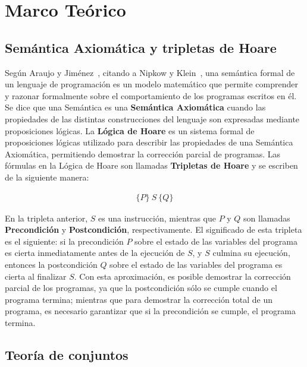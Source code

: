 \chapter{Marco Teórico}
\label{capitulo1}

\section{Semántica Axiomática y tripletas de Hoare}

Según Araujo y Jiménez~\cite{ayj}, citando a Nipkow y Klein~\cite{concrete}, una
semántica formal de un lenguaje de programación es un modelo matemático que
permite comprender y razonar formalmente sobre el comportamiento de los
programas escritos en él. Se dice que una Semántica es una \textbf{Semántica
Axiomática} cuando las propiedades de las  distintas construcciones del lenguaje
son expresadas mediante proposiciones lógicas. La \textbf{Lógica de Hoare} es un
sistema formal de proposiciones lógicas utilizado para describir  las
propiedades de una Semántica Axiomática, permitiendo demostrar la corrección
parcial de programas. Las fórmulas en la Lógica de Hoare son llamadas
\textbf{Tripletas de Hoare} y se escriben de la siguiente manera:

\begin{equation*}
\begin{gathered}
\{P\}\ S\ \{Q\}
\end{gathered}
\end{equation*}


En la tripleta anterior, $S$ es una instrucción, mientras que $P$ y $Q$ son
llamadas \textbf{Precondición} y \textbf{Postcondición}, respectivamente. El
significado de esta tripleta es el siguiente: si la precondición $P$ sobre el
estado de las variables del programa es cierta inmediatamente antes de la
ejecución de $S$, y $S$ culmina su ejecución, entonces la postcondición $Q$ sobre
el estado de las variables del programa es cierta al finalizar $S$. Con esta
aproximación, es posible demostrar la corrección parcial de los programas, ya
que la postcondición sólo se cumple cuando el programa termina; mientras que para
demostrar la corrección total de un programa, es necesario garantizar que si la
precondición se cumple, el programa termina.

\section{Teoría de conjuntos}

